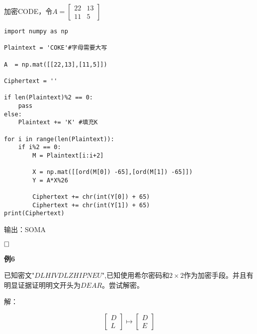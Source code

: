 \documentclass{article}
\begin{document}
加密CODE，令$A=\left[\begin{array}{cc}
22 & 13 \\
11 & 5
\end{array}\right]$
\begin{lstlisting}
import numpy as np

Plaintext = 'COKE'#字母需要大写

A  = np.mat([[22,13],[11,5]])

Ciphertext = ''

if len(Plaintext)%2 == 0:
    pass
else:
    Plaintext += 'K' #填充K

for i in range(len(Plaintext)):
    if i%2 == 0:
        M = Plaintext[i:i+2]
        
        X = np.mat([[ord(M[0]) -65],[ord(M[1]) -65]]) 
        Y = A*X%26
        
        Ciphertext += chr(int(Y[0]) + 65)
        Ciphertext += chr(int(Y[1]) + 65)
print(Ciphertext)    
\end{lstlisting}

输出：SOMA

$\hfill\square$ 


\clearpage

\textbf{例6}

已知密文"$DLHIVDLZHIPNEU$",已知使用希尔密码和$2 \times 2$作为加密手段。并且有明显证据证明明文开头为$DEAR$。尝试解密。

解：




$$
\left[\begin{array}{l}
D \\
L
\end{array}\right] \mapsto\left[\begin{array}{l}
D \\
E
\end{array}\right]
$$
\end{document}
